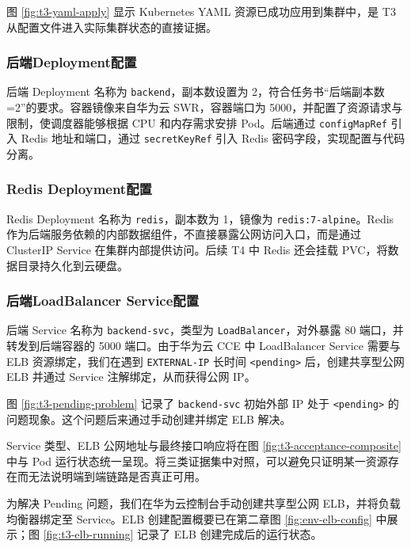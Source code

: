 图 \ref{fig:t3-yaml-apply} 显示 Kubernetes YAML 资源已成功应用到集群中，是 T3 从配置文件进入实际集群状态的直接证据。

\subsubsection{后端Deployment配置}

后端 Deployment 名称为 \verb|backend|，副本数设置为 2，符合任务书“后端副本数=2”的要求。容器镜像来自华为云 SWR，容器端口为 5000，并配置了资源请求与限制，使调度器能够根据 CPU 和内存需求安排 Pod。后端通过 \verb|configMapRef| 引入 Redis 地址和端口，通过 \verb|secretKeyRef| 引入 Redis 密码字段，实现配置与代码分离。

\subsubsection{Redis Deployment配置}

Redis Deployment 名称为 \verb|redis|，副本数为 1，镜像为 \verb|redis:7-alpine|。Redis 作为后端服务依赖的内部数据组件，不直接暴露公网访问入口，而是通过 ClusterIP Service 在集群内部提供访问。后续 T4 中 Redis 还会挂载 PVC，将数据目录持久化到云硬盘。

\subsubsection{后端LoadBalancer Service配置}

后端 Service 名称为 \verb|backend-svc|，类型为 \verb|LoadBalancer|，对外暴露 80 端口，并转发到后端容器的 5000 端口。由于华为云 CCE 中 LoadBalancer Service 需要与 ELB 资源绑定，我们在遇到 \verb|EXTERNAL-IP| 长时间 \verb|<pending>| 后，创建共享型公网 ELB 并通过 Service 注解绑定，从而获得公网 IP。


图 \ref{fig:t3-pending-problem} 记录了 \verb|backend-svc| 初始外部 IP 处于 \verb|<pending>| 的问题现象。这个问题后来通过手动创建并绑定 ELB 解决。

Service 类型、ELB 公网地址与最终接口响应将在图 \ref{fig:t3-acceptance-composite} 中与 Pod 运行状态统一呈现。将三类证据集中对照，可以避免只证明某一资源存在而无法说明端到端链路是否真正可用。

为解决 Pending 问题，我们在华为云控制台手动创建共享型公网 ELB，并将负载均衡器绑定至 Service。ELB 创建配置概要已在第二章图 \ref{fig:env-elb-config} 中展示；图 \ref{fig:t3-elb-running} 记录了 ELB 创建完成后的运行状态。

